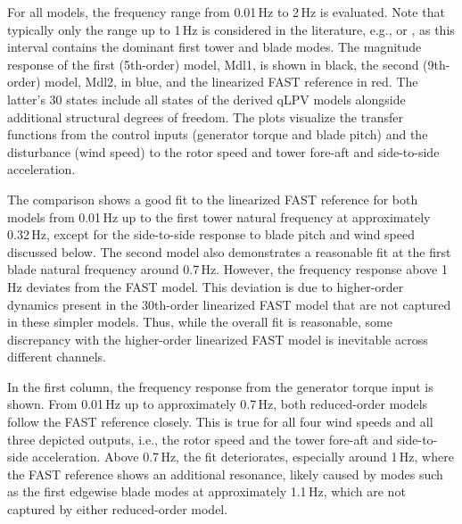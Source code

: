    For all models, the frequency range from 0.01\,Hz to 2\,Hz is evaluated. Note that typically only the range up to 1\,Hz is considered in the literature, e.g., \cite{schlipf2013nonlinear} or \cite{pamososuryo2022individual}, as this interval contains the dominant first tower and blade modes. The magnitude response of the first (5th-order) model, Mdl1, is shown in black, the second (9th-order) model, Mdl2, in blue, and the linearized FAST reference in red. The latter's 30 states include all states of the derived qLPV models alongside additional structural degrees of freedom. The plots visualize the transfer functions from the control inputs (generator torque and blade pitch) and the disturbance (wind speed) to the rotor speed and tower fore-aft and side-to-side acceleration.
    
    The comparison shows a good fit to the linearized FAST reference for both models from 0.01\,Hz up to the first tower natural frequency at approximately 0.32\,Hz, except for the side-to-side response to blade pitch and wind speed discussed below. The second model also demonstrates a reasonable fit at the first blade natural frequency around 0.7\,Hz. However, the frequency response above 1\,Hz deviates from the FAST model. This deviation is due to higher-order dynamics present in the 30th-order linearized FAST model that are not captured in these simpler models. Thus, while the overall fit is reasonable, some discrepancy with the higher-order linearized FAST model is inevitable across different channels.
    
    In the first column, the frequency response from the generator torque input is shown. From 0.01\,Hz up to approximately 0.7\,Hz, both reduced-order models follow the FAST reference closely. This is true for all four wind speeds and all three depicted outputs, i.e., the rotor speed and the tower fore-aft and side-to-side acceleration. Above 0.7\,Hz, the fit deteriorates, especially around 1\,Hz, where the FAST reference shows an additional resonance, likely caused by modes such as the first edgewise blade modes at approximately 1.1\,Hz, which are not captured by either reduced-order model.
    
